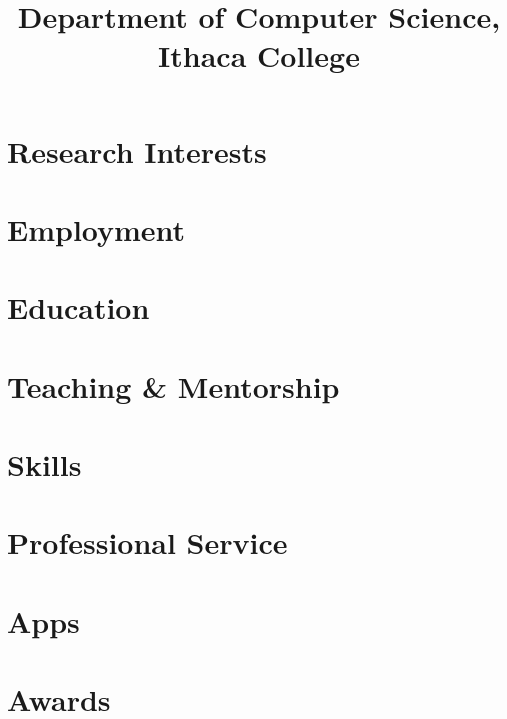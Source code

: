 \documentclass[11pt, letterpaper]{practical-cv}
\title{Department of Computer Science,\\Ithaca College}
\begin{document}
\makecvtitle

\section{Research Interests}


\section{Employment}


\section{Education}


\printbibliography[title=Peer-Reviewed Publications, nottype=misc]

\setlength\bibitemsep{0.5em}
\printbibliography[title=Talks, type=misc, resetnumbers=true]

\section{Teaching \& Mentorship}


\section{Skills}


\section{Professional Service}


\section{Apps}


\section{Awards}

\end{document}
